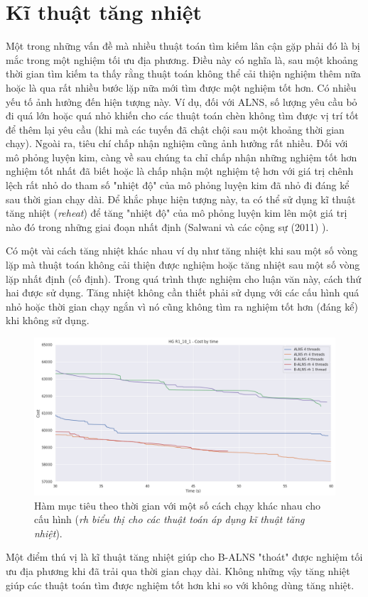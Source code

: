 \section{Kĩ thuật tăng nhiệt}
\label{sec:reheat}
Một trong những vấn đề mà nhiều thuật toán tìm kiếm lân cận gặp phải đó là bị mắc trong một nghiệm tối ưu địa phương. Điều này có nghĩa là, sau một khoảng thời gian tìm kiếm ta thấy rằng thuật toán không thể cải thiện nghiệm thêm nữa hoặc là qua rất nhiều bước lặp nữa mới tìm được một nghiệm tốt hơn. Có nhiều yếu tố ảnh hưởng đến hiện tượng này. Ví dụ, đối với ALNS, số lượng yêu cầu bỏ đi quá lớn hoặc quá nhỏ khiến cho các thuật toán chèn không tìm được vị trí tốt để thêm lại yêu cầu (khi mà các tuyến đã chật chội sau một khoảng thời gian chạy). Ngoài ra, tiêu chí chấp nhận nghiệm cũng ảnh hưởng rất nhiều. Đối với mô phỏng luyện kim, càng về sau chúng ta chỉ chấp nhận những nghiệm tốt hơn nghiệm tốt nhất đã biết hoặc là chấp nhận một nghiệm tệ hơn với giá trị chênh lệch rất nhỏ do tham số "nhiệt độ" của mô phỏng luyện kim đã nhỏ đi đáng kể sau thời gian chạy dài. Để khắc phục hiện tượng này, ta có thể sử dụng kĩ thuật tăng nhiệt (\textit{reheat}) để tăng "nhiệt độ" của mô phỏng luyện kim lên một giá trị nào đó trong những giai đoạn nhất định (Salwani và các cộng sự (2011) \cite{salwani2011re}). 

Có một vài cách tăng nhiệt khác nhau ví dụ như tăng nhiệt khi sau một số vòng lặp mà thuật toán không cải thiện được nghiệm hoặc tăng nhiệt sau một số vòng lặp nhất định (cố định). Trong quá trình thực nghiệm cho luận văn này, cách thứ hai được sử dụng. Tăng nhiệt không cần thiết phải sử dụng với các cấu hình quá nhỏ hoặc thời gian chạy ngắn vì nó cũng không tìm ra nghiệm tốt hơn (đáng kể) khi không sử dụng. 

\begin{figure}[H] %
  \centering %
  \includegraphics[width=1\textwidth]{figures/cost_time_R1_10_1_rh.png} 
  \caption{Hàm mục tiêu theo thời gian với một số cách chạy khác nhau cho cấu hình  (\textit{rh biểu thị cho các thuật toán áp dụng kĩ thuật tăng nhiệt}).} 
  \label{fig:reheat1}
\end{figure}

Một điểm thú vị là kĩ thuật tăng nhiệt giúp cho B-ALNS "thoát" được nghiệm tối ưu địa phương khi đã trải qua thời gian chạy dài. Không những vậy tăng nhiệt giúp các thuật toán tìm được nghiệm tốt hơn khi so với không dùng tăng nhiệt.